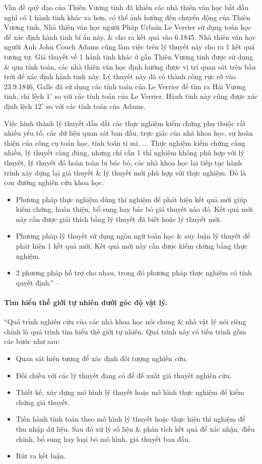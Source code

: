 \documentclass[oneside]{book}
\numberwithin{equation}{section}
\begin{document}
Vấn đề quỹ đạo của Thiên Vương tinh đã khiến các nhà thiên văn học bắt đầu nghĩ có 1 hành tinh khác xa hơn, có thể ảnh hưởng đến chuyển động của Thiên Vương tinh. Nhà thiên văn học người Pháp Urbain Le Verrier sử dụng toán học để xác định hành tinh bí ẩn này, \& cho ra kết quả vào 6.1845. Nhà thiên văn học người Anh John Couch Adams cũng làm việc trên lý thuyết này cho ra 1 kết quả tương tự. Giả thuyết về 1 hành tinh khác ở gần Thiên Vương tinh được sử dụng \& qua tính toán, các nhà thiên văn học định hướng được vị trí quan sát trên bầu trời để xác định hành tinh này. Lý thuyết này đã có thành công rực rỡ vào 23.9.1846, Galle đã sử dụng các tính toán của Le Verrier để tìm ra Hải Vương tinh, chỉ lệch $1^\circ$ so với các tính toán của Le Verrier. Hành tinh này cũng được xác định lệch $12^\circ$ so với các tính toán của Adams.

Việc hình thành lý thuyết dẫn dắt các thực nghiệm kiểm chứng phụ thuộc rất nhiều yếu tố, các dữ liệu quan sát ban đầu, trực giác của nhà khoa học, sự hoàn thiện của công cụ toán học, tính toán tỉ mỉ, $\ldots$ Thực nghiệm kiểm chứng càng nhiều, lý thuyết càng đúng, nhưng chỉ cần 1 thí nghiệm không phù hợp với lý thuyết, lý thuyết đó hoàn toàn bị bác bỏ, các nhà khoa học lại tiếp tục hành trình xây dựng lại giả thuyết \& lý thuyết mới phù hợp với thực nghiệm. Đó là con đường nghiên cứu khoa học.
\begin{itemize}
	\item Phương pháp thực nghiệm dùng thí nghiệm để phát hiện kết quả mới giúp kiểm chứng, hoàn thiện, bổ sung hay bác bỏ giả thuyết nào đó. Kết quả mới này cần được giải thích bằng lý thuyết đã biết hoặc lý thuyết mới.
	\item Phương pháp lý thuyết sử dụng ngôn ngữ toán học \& suy luận lý thuyết để phát hiện 1 kết quả mới. Kết quả mới này cần được kiểm chứng bằng thực nghiệm.
	\item 2 phương pháp hỗ trợ cho nhau, trong đó phương pháp thực nghiệm có tính quyết định.'' -- \cite[pp. 7--8]{SGK_Vat_Ly_10_Chan_Troi_Sang_Tao}
\end{itemize}

\paragraph{Tìm hiểu thế giới tự nhiên dưới góc độ vật lý.}
``Quá trình nghiên cứu của các nhà khoa học nói chung \& nhà vật lý nói riêng chính là quá trình tìm hiểu thế giới tự nhiên. Quá trình này có tiến trình gồm các bước như sau:
\begin{itemize}
	\item Quan sát hiện tượng để xác định đối tượng nghiên cứu.
	\item Đối chiều với các lý thuyết đang có để đề xuất giả thuyết nghiên cứu.
	\item Thiết kế, xây dựng mô hình lý thuyết hoặc mô hình thực nghiệm để kiểm chứng giả thuyết.
	\item Tiến hành tính toán theo mô hình lý thuyết hoặc thực hiện thí nghiệm để thu nhập dữ liệu. Sau đó xử lý số liệu \& phân tích kết quả để xác nhận, điều chỉnh, bổ sung hay loại bỏ mô hình, giả thuyết ban đầu.
	\item Rút ra kết luận.
\end{itemize}
\end{document}
